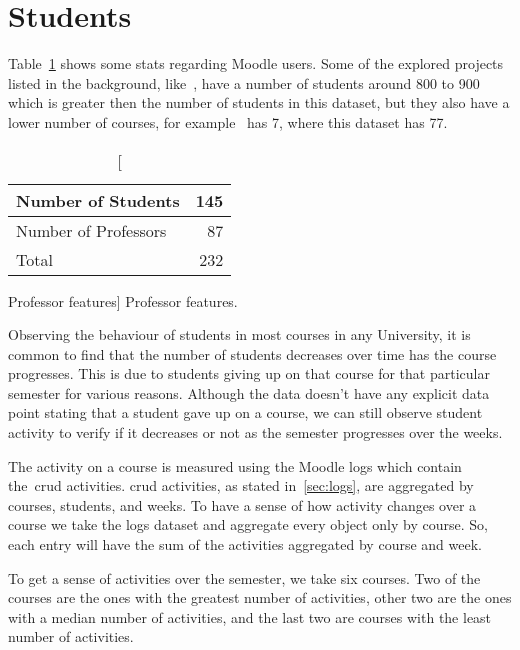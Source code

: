 \section{Students}

Table~\ref{tab:moodle_users_stats} shows some stats regarding Moodle users.
Some of the explored projects listed in the background, like~\cite{ind_001},
have a number of students around 800 to 900 which is greater then the number of
students in this dataset, but they also have a lower number of courses, for
example~\cite{ind_001} has 7, where this dataset has 77.

\begin{table}[h!]
    \centering

    \begin{tabular}{| l | r |}
        \hline
        Number of Students   & 145 \\ \hline
        Number of Professors & 87  \\ \hline
        Total                & 232 \\ \hline
    \end{tabular}

    \caption
        [Professor features]
        {Professor features.}

    \label{tab:moodle_users_stats}
\end{table}

Observing the behaviour of students in most courses in any University, it is
common to find that the number of students decreases over time has the course
progresses. This is due to students giving up on that course for that
particular semester for various reasons. Although the data doesn't have any
explicit data point stating that a student gave up on a course, we can still
observe student activity to verify if it decreases or not as the semester
progresses over the weeks.

The activity on a course is measured using the Moodle logs which contain
the~\gls{crud} activities. \gls{crud} activities, as stated in~\ref{sec:logs},
are aggregated by courses, students, and weeks. To have a sense of how activity
changes over a course we take the logs dataset and aggregate every object only
by course. So, each entry will have the sum of the activities aggregated by
course and week.

To get a sense of activities over the semester, we take six courses. Two of the
courses are the ones with the greatest number of activities, other two are the
ones with a median number of activities, and the last two are courses with the
least number of activities.

